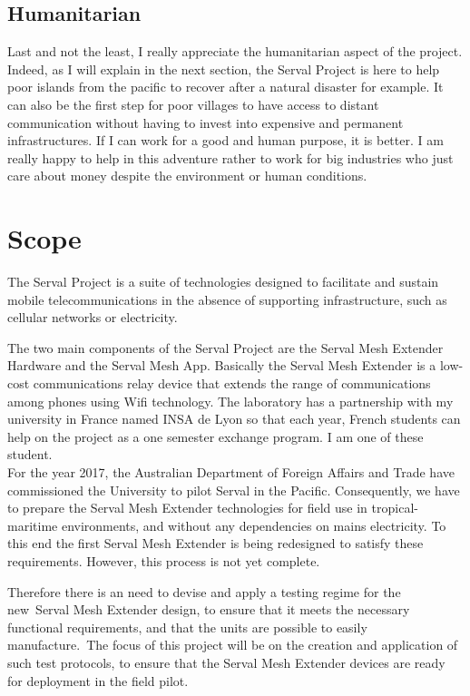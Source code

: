 \subsection{Humanitarian}
Last and not the least, I really appreciate the humanitarian aspect of the project. Indeed, as I will explain in the next section, the Serval Project is here to help poor islands from the pacific to recover after a natural disaster for example. It can also be the first step for poor villages to have access to distant communication without having to invest into expensive and permanent infrastructures. If I can work for a good and human purpose, it is better. I am really happy to help in this adventure rather to work for big industries who just care about money despite the environment or human conditions. 

\section{Scope}
The Serval Project is a suite of technologies designed to facilitate and sustain mobile telecommunications in the absence of supporting infrastructure, such as cellular networks or electricity. \par The two main components of the Serval Project are the Serval Mesh Extender Hardware and the Serval Mesh App. Basically the Serval Mesh Extender is a low-cost communications relay device that extends the range of communications among phones using Wifi technology. The laboratory has a partnership with my university in France named INSA de Lyon so that each year, French students can help on the project as a one semester exchange program. I am one of these student. \\ 

For the year 2017, the Australian Department of Foreign Affairs and Trade have commissioned the University to pilot Serval in the Pacific. Consequently, we have to prepare the Serval Mesh Extender technologies for field use in tropical-maritime environments, and without any dependencies on mains electricity. To this end the first Serval Mesh Extender is being redesigned to satisfy these requirements. However, this process is not yet complete. \par

Therefore there is an need to devise and apply a testing regime for the new Serval Mesh Extender design, to ensure that it meets the necessary functional requirements, and that the units are possible to easily manufacture. The focus of this project will be on the creation and application of such test protocols, to ensure that the Serval Mesh Extender devices are ready for deployment in the field pilot.


